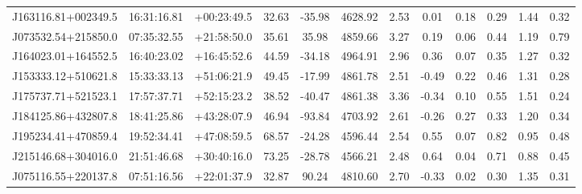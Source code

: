\documentclass[a4paper,fleqn,usenatbib]{mnras}
\begin{document}
\begin{table}
\begin{tabular}{@{}cccccccccccc@{}}
			J163116.81+002349.5 & 16:31:16.81 & +00:23:49.5  & 32.63               	& -35.98              	& 4628.92             	& 2.53           	& 0.01               	& 0.18                   	& 0.29                     	& 1.44             	& 0.32       	\\
			J073532.54+215850.0 & 07:35:32.55 & +21:58:50.0  & 35.61               	& 35.98               	& 4859.66             	& 3.27           	& 0.19               	& 0.06                   	& 0.44                     	& 1.19             	& 0.79       	\\
			J164023.01+164552.5 & 16:40:23.02 & +16:45:52.6  & 44.59               	& -34.18              	& 4964.91             	& 2.96           	& 0.36               	& 0.07                   	& 0.35                     	& 1.27             	& 0.32       	\\
			J153333.12+510621.8 & 15:33:33.13 & +51:06:21.9  & 49.45               	& -17.99              	& 4861.78             	& 2.51           	& -0.49              	& 0.22                   	& 0.46                     	& 1.31             	& 0.28       	\\
			J175737.71+521523.1 & 17:57:37.71 & +52:15:23.2  & 38.52               	& -40.47              	& 4861.38             	& 3.36           	& -0.34              	& 0.10                   	& 0.55                     	& 1.51             	& 0.24       	\\
			J184125.86+432807.8 & 18:41:25.86 & +43:28:07.9  & 46.94               	& -93.84              	& 4703.92             	& 2.61           	& -0.26              	& 0.27                   	& 0.33                     	& 1.20             	& 0.34       	\\
			J195234.41+470859.4 & 19:52:34.41 & +47:08:59.5  & 68.57               	& -24.28              	& 4596.44             	& 2.54           	& 0.55               	& 0.07                   	& 0.82                     	& 0.95             	& 0.48       	\\
			J215146.68+304016.0 & 21:51:46.68 & +30:40:16.0  & 73.25               	& -28.78              	& 4566.21             	& 2.48           	& 0.64               	& 0.04                   	& 0.71                     	& 0.88             	& 0.45       	\\
			J075116.55+220137.8 & 07:51:16.56 & +22:01:37.9  & 32.87               	& 90.24               	& 4810.60             	& 2.70           	& -0.33              	& 0.02                   	& 0.30                     	& 1.35             	& 0.31       	\\

\end{tabular}
\end{table}
\end{document}
